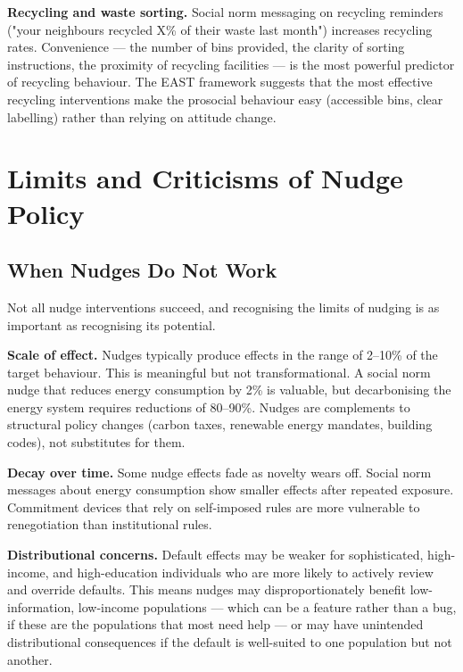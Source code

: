 \documentclass[12pt, letterpaper]{article}
\begin{document}
\textbf{Recycling and waste sorting.} Social norm messaging on recycling reminders ("your neighbours recycled X\% of their waste last month") increases recycling rates. Convenience --- the number of bins provided, the clarity of sorting instructions, the proximity of recycling facilities --- is the most powerful predictor of recycling behaviour. The EAST framework suggests that the most effective recycling interventions make the prosocial behaviour easy (accessible bins, clear labelling) rather than relying on attitude change.

\medskip


\section{Limits and Criticisms of Nudge Policy}



\subsection{When Nudges Do Not Work}


Not all nudge interventions succeed, and recognising the limits of nudging is as important as recognising its potential.

\textbf{Scale of effect.} Nudges typically produce effects in the range of 2--10\% of the target behaviour. This is meaningful but not transformational. A social norm nudge that reduces energy consumption by 2\% is valuable, but decarbonising the energy system requires reductions of 80--90\%. Nudges are complements to structural policy changes (carbon taxes, renewable energy mandates, building codes), not substitutes for them.

\textbf{Decay over time.} Some nudge effects fade as novelty wears off. Social norm messages about energy consumption show smaller effects after repeated exposure. Commitment devices that rely on self-imposed rules are more vulnerable to renegotiation than institutional rules.

\textbf{Distributional concerns.} Default effects may be weaker for sophisticated, high-income, and high-education individuals who are more likely to actively review and override defaults. This means nudges may disproportionately benefit low-information, low-income populations --- which can be a feature rather than a bug, if these are the populations that most need help --- or may have unintended distributional consequences if the default is well-suited to one population but not another.
\end{document}
